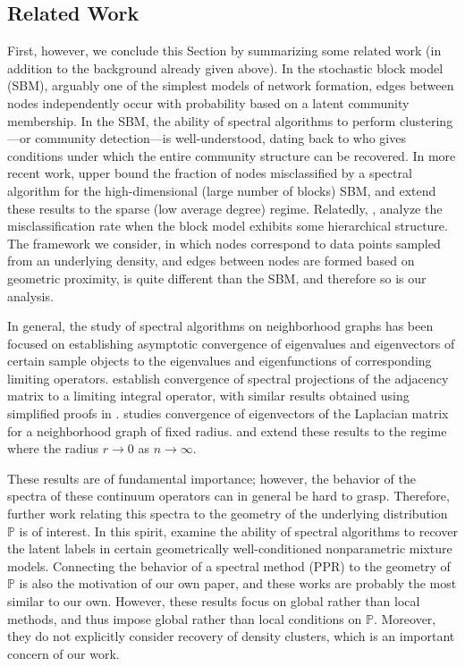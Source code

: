 \documentclass[11pt,twoside]{article}
\newcommand{\1}{\mathbf{1}}
\newcommand{\Pbb}{\mathbb{P}}
\begin{document}
\subsection{Related Work}
\label{subsec:related_work}
First, however, we conclude this Section by summarizing some related work (in addition to the background already given above). In the stochastic block model (SBM), arguably one of the simplest models of network formation, edges between nodes independently occur with probability based on a latent community membership. In the SBM, the ability of spectral algorithms to perform clustering---or community detection---is well-understood, dating 
back to \citet{mcsherry2001} who gives conditions under which the entire
community structure can be recovered. In more recent work, \citet{rohe2011}
upper bound the fraction of nodes misclassified by a spectral algorithm for the
high-dimensional (large number of blocks) SBM, and \citet{lei2015} extend these
results to the sparse (low average degree) regime. Relatedly,
\citet{clauset08,balakrishnan2011,li2018}, analyze the misclassification rate
when the block model exhibits some hierarchical structure. The framework we
consider, in which nodes correspond to data points sampled from an underlying 
density, and edges between nodes are formed based on geometric proximity, is
quite different than the SBM, and therefore so is our analysis.

In general, the study of spectral algorithms on neighborhood graphs has been
focused on establishing asymptotic convergence of eigenvalues and eigenvectors
of certain sample objects to the eigenvalues and eigenfunctions of corresponding
limiting operators. \citet{koltchinskii2000} establish convergence of spectral
projections of the adjacency matrix to a limiting integral operator, with
similar results obtained using simplified proofs in
\citet{rosasco10}. \citet{vonluxburg2008} studies convergence of eigenvectors of
the Laplacian matrix for a neighborhood graph of fixed radius. \citet{belkin07} and
\citet{garciatrillos18} extend these results to the regime where the radius $r
\to 0$ as $n \to \infty$.

These results are of fundamental importance; however, the behavior of the
spectra of these continuum operators can in general be hard to grasp. Therefore,
further work relating this spectra to the geometry of the underlying
distribution $\Pbb$ is of interest. In this spirit, \citet{shi2009,schiebinger2015,garciatrillos19} examine the ability of spectral
algorithms to recover the latent labels in certain geometrically
well-conditioned nonparametric mixture models. Connecting the behavior of a spectral method (PPR) to the geometry of $\Pbb$ is also the motivation of our own paper, and these works are probably the most similar to our own. However, these results focus on global rather than local methods, and thus impose global rather than local conditions on $\Pbb$. Moreover, they do not explicitly consider 
recovery of density clusters, which is an important concern of our work.
\end{document}
